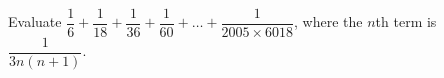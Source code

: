 Evaluate $\dfrac16+\dfrac1{18}+\dfrac1{36}+\dfrac1{60}+\dots+\dfrac1{2005\times6018}$, where the $n$th term is $\dfrac1{3n(n+1)}$.
